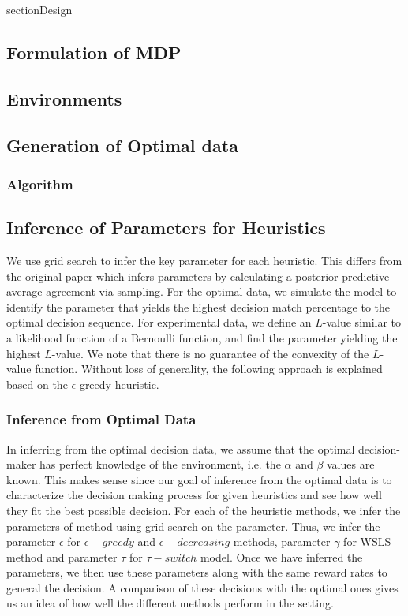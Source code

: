 section{Design}
\label{design}


\subsection{Formulation of MDP}

\subsection{Environments}



\subsection{Generation of Optimal data}

\subsubsection{Algorithm}



\subsection{Inference of Parameters for Heuristics}
We use grid search to infer the key parameter for each heuristic. This differs from the original paper which infers parameters by calculating a posterior predictive average agreement via sampling. For the optimal data, we simulate the model to identify the parameter that yields the highest decision match percentage to the optimal decision sequence. For experimental data, we define an $L$-value similar to a likelihood function of a Bernoulli function, and find the parameter yielding the highest $L$-value. We note that there is no guarantee of the convexity of the $L$-value function. Without loss of generality, the following approach is explained based on the $\epsilon$-greedy heuristic. 

\subsubsection{Inference from Optimal Data}
In inferring from the optimal decision data, we assume that the optimal decision-maker has perfect knowledge of the environment, i.e. the $\alpha$ and $\beta$ values are known. This makes sense since our goal of inference from the optimal data is to characterize the decision making process for given heuristics and see how well they fit the best possible decision. For each of the heuristic methods, we infer the parameters of method using grid search on the parameter. Thus, we infer the parameter $\epsilon$ for $\epsilon-greedy$ and $\epsilon-decreasing$ methods, parameter $\gamma$ for WSLS method and parameter $\tau$ for $\tau-switch$ model. Once we have inferred the parameters, we then use these parameters along with the same reward rates to general the decision. A comparison of these decisions with the optimal ones gives us an idea of how well the different methods perform in the setting. 


